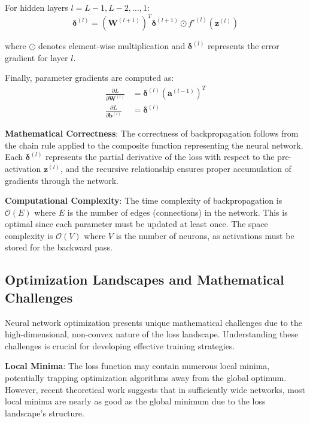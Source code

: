 \documentclass[11pt,a4paper]{report}
\begin{document}
For hidden layers $l = L-1, L-2, \ldots, 1$:
\begin{equation}
\boldsymbol{\delta}^{(l)} = (\mathbf{W}^{(l+1)})^T \boldsymbol{\delta}^{(l+1)} \odot f'^{(l)}(\mathbf{z}^{(l)})
\end{equation}

where $\odot$ denotes element-wise multiplication and $\boldsymbol{\delta}^{(l)}$ represents the error gradient for layer $l$.

Finally, parameter gradients are computed as:
\begin{align}
\frac{\partial L}{\partial \mathbf{W}^{(l)}} &= \boldsymbol{\delta}^{(l)} (\mathbf{a}^{(l-1)})^T \\
\frac{\partial L}{\partial \mathbf{b}^{(l)}} &= \boldsymbol{\delta}^{(l)}
\end{align}

\textbf{Mathematical Correctness}: The correctness of backpropagation follows from the chain rule applied to the composite function representing the neural network. Each $\boldsymbol{\delta}^{(l)}$ represents the partial derivative of the loss with respect to the pre-activation $\mathbf{z}^{(l)}$, and the recursive relationship ensures proper accumulation of gradients through the network.

\textbf{Computational Complexity}: The time complexity of backpropagation is $\mathcal{O}(E)$ where $E$ is the number of edges (connections) in the network. This is optimal since each parameter must be updated at least once. The space complexity is $\mathcal{O}(V)$ where $V$ is the number of neurons, as activations must be stored for the backward pass.

\subsection{Optimization Landscapes and Mathematical Challenges}

Neural network optimization presents unique mathematical challenges due to the high-dimensional, non-convex nature of the loss landscape. Understanding these challenges is crucial for developing effective training strategies.

\textbf{Local Minima}: The loss function may contain numerous local minima, potentially trapping optimization algorithms away from the global optimum. However, recent theoretical work suggests that in sufficiently wide networks, most local minima are nearly as good as the global minimum due to the loss landscape's structure.
\end{document}
